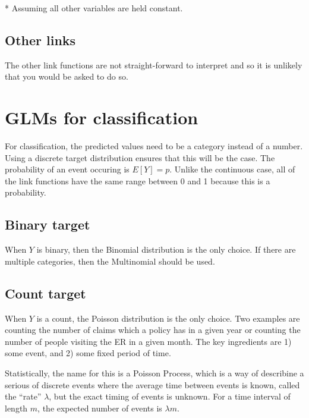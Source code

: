 \documentclass[
  openany]{book}
\begin{document}
* Assuming all other variables are held constant.

\hypertarget{other-links}{%
\section{Other links}\label{other-links}}

The other link functions are not straight-forward to interpret and so it is unlikely that you would be asked to do so.

\hypertarget{glms-for-classification}{%
\chapter{GLMs for classification}\label{glms-for-classification}}

For classification, the predicted values need to be a category instead of a number. Using a discrete target distribution ensures that this will be the case. The probability of an event occuring is \(E[Y] = p\). Unlike the continuous case, all of the link functions have the same range between 0 and 1 because this is a probability.

\hypertarget{binary-target}{%
\section{Binary target}\label{binary-target}}

When \(Y\) is binary, then the Binomial distribution is the only choice. If there are multiple categories, then the Multinomial should be used.

\hypertarget{count-target}{%
\section{Count target}\label{count-target}}

When \(Y\) is a count, the Poisson distribution is the only choice. Two examples are counting the number of claims which a policy has in a given year or counting the number of people visiting the ER in a given month. The key ingredients are 1) some event, and 2) some fixed period of time.

Statistically, the name for this is a Poisson Process, which is a way of describine a serious of discrete events where the average time between events is known, called the ``rate'' \(\lambda\), but the exact timing of events is unknown. For a time interval of length \(m\), the expected number of events is \(\lambda m\).
\end{document}
